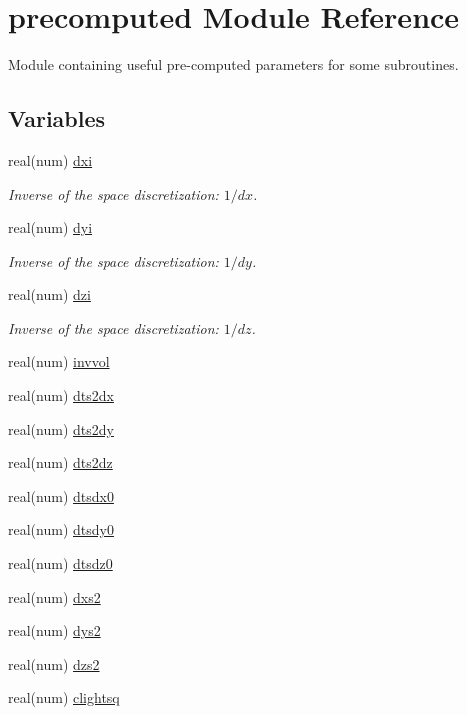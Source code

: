 \hypertarget{namespaceprecomputed}{}\section{precomputed Module Reference}
\label{namespaceprecomputed}


Module containing useful pre-\/computed parameters for some subroutines.  


\subsection*{Variables}
\begin{DoxyCompactItemize}
\item 
real(num) \hyperlink{namespaceprecomputed_a3277a11e038b89b7572ad654aa6ebdf9}{dxi}
\begin{DoxyCompactList}\small\item\em Inverse of the space discretization\+: $ 1/dx $. \end{DoxyCompactList}\item 
real(num) \hyperlink{namespaceprecomputed_aba4c7d47df04f7bff362b159a9507bd0}{dyi}
\begin{DoxyCompactList}\small\item\em Inverse of the space discretization\+: $ 1/dy $. \end{DoxyCompactList}\item 
real(num) \hyperlink{namespaceprecomputed_a3c123d2eff796366a81e11166d6c27ff}{dzi}
\begin{DoxyCompactList}\small\item\em Inverse of the space discretization\+: $ 1/dz $. \end{DoxyCompactList}\item 
real(num) \hyperlink{namespaceprecomputed_a6292a71558c6ec034afe504b6cf7b513}{invvol}
\item 
real(num) \hyperlink{namespaceprecomputed_a49f042055cd92a009da4a02b628430f7}{dts2dx}
\item 
real(num) \hyperlink{namespaceprecomputed_a173032b2394c4ed6da5fb1364fe17e6a}{dts2dy}
\item 
real(num) \hyperlink{namespaceprecomputed_af41461f1d38aa90f6b75318b3a6e8b70}{dts2dz}
\item 
real(num) \hyperlink{namespaceprecomputed_a2bd90255663762ded81c6d3dbdcc19d7}{dtsdx0}
\item 
real(num) \hyperlink{namespaceprecomputed_a88b7e24cb65cc21e1b7615d05e084b76}{dtsdy0}
\item 
real(num) \hyperlink{namespaceprecomputed_a343fe0f72331fa141bb2d08cb34a43af}{dtsdz0}
\item 
real(num) \hyperlink{namespaceprecomputed_a4119d52a225aef26edac32983c0b904e}{dxs2}
\item 
real(num) \hyperlink{namespaceprecomputed_a82348c2bcd0de288186bf33726d7d35a}{dys2}
\item 
real(num) \hyperlink{namespaceprecomputed_a346904589bbf53c6f100296d1b29b7ca}{dzs2}
\item 
real(num) \hyperlink{namespaceprecomputed_adbd674e54a2326703d464d475f0d1dc2}{clightsq}
\end{DoxyCompactItemize}


